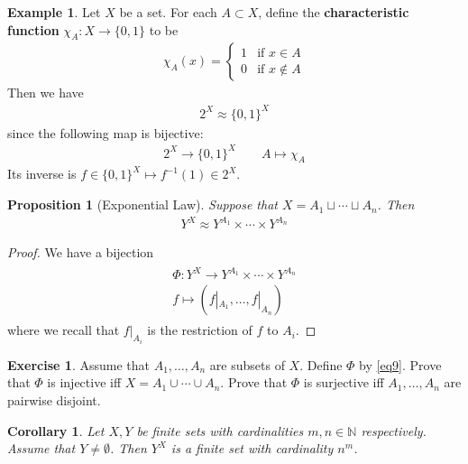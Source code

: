 \documentclass[12pt,b5paper,notitlepage]{article}
\theoremstyle{definition}
\newtheorem{eg}[df]{Example}
\newtheorem{exe}[df]{Exercise}
\theoremstyle{plain}
\newtheorem{pp}[df]{Proposition}
\newtheorem{co}[df]{Corollary}
\newcommand{\Nbb}{\mathbb N}
\numberwithin{equation}{section}
\begin{document}
\begin{eg}\label{lb11}
Let $X$ be a set. For each $A\subset X$, define the \textbf{characteristic function}   $\chi_A:X\rightarrow\{0,1\}$ to be
\begin{align*}
\chi_A(x)=\left\{
\begin{array}{ll}
1&\text{if }x\in A\\
0&\text{if }x\notin A
\end{array}
\right.
\end{align*}
Then we have
\begin{align*}
2^X\approx \{0,1\}^X
\end{align*}
since the following map is bijective:
\begin{gather*}
2^X\rightarrow\{0,1\}^X\qquad A\mapsto\chi_A
\end{gather*}
Its inverse is $f\in\{0,1\}^X\mapsto f^{-1}(1)\in 2^X$.
\end{eg}

\begin{pp}[Exponential Law]\label{lb10}
Suppose that $X=A_1\sqcup\cdots\sqcup A_n$. Then
\begin{align*}
Y^X\approx Y^{A_1}\times \cdots\times Y^{A_n}
\end{align*}
\end{pp}

\begin{proof}
We have a bijection
\begin{gather}\label{eq9}
\begin{gathered}
\Phi:Y^X\rightarrow Y^{A_1}\times \cdots\times Y^{A_n}\\
f\mapsto (f|_{A_1},\dots,f|_{A_n})
\end{gathered}
\end{gather}
where we recall that $f|_{A_i}$ is the restriction of $f$ to $A_i$. 
\end{proof}

\begin{exe}
Assume that $A_1,\dots,A_n$ are subsets of $X$. Define $\Phi$ by \eqref{eq9}. Prove that $\Phi$ is injective iff $X=A_1\cup\cdots\cup A_n$. Prove that $\Phi$ is surjective iff $A_1,\dots, A_n$ are pairwise disjoint. 
\end{exe}

\begin{co}\label{lb12}
Let $X,Y$ be finite sets with cardinalities $m,n\in\Nbb$ respectively. Assume that $Y\neq\emptyset$. Then $Y^X$ is a finite set with cardinality $n^m$.
\end{co}
\end{document}
